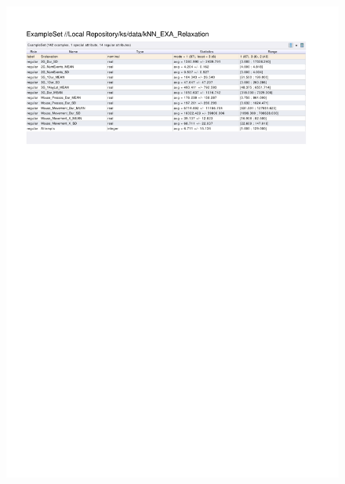 \begin{figure}[htp]
  \centerline{\includegraphics[trim=0 600 0 60,clip,width=16.09cm]{results/kNN_EXA_Relaxation.pdf}} \caption{
} \label{kNN_K_Relaxation}
\end{figure}

